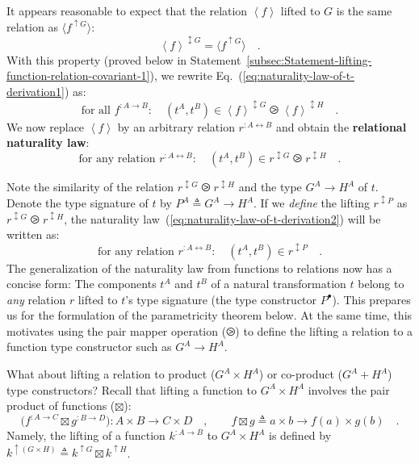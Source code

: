 It appears reasonable to expect that the relation $\left<f\right>$
lifted to $G$ is the same relation as $\langle f^{\uparrow G}\rangle$:
\[
\left<f\right>^{\updownarrow G}=\langle f^{\uparrow G}\rangle\quad.
\]
With this property (proved below in Statement~\ref{subsec:Statement-lifting-function-relation-covariant-1}),
we rewrite Eq.~(\ref{eq:naturality-law-of-t-derivation1}) as:
\[
\text{for all }f^{:A\rightarrow B}:\quad(t^{A},t^{B})\in\left<f\right>^{\updownarrow G}\ogreaterthan\left<f\right>^{\updownarrow H}\quad.
\]
We now replace $\left<f\right>$ by an arbitrary relation $r^{:A\leftrightarrow B}$
and obtain the \textbf{relational
naturality law}:
\begin{equation}
\text{for any relation }r^{:A\leftrightarrow B}:\quad(t^{A},t^{B})\in r^{\updownarrow G}\ogreaterthan r^{\updownarrow H}\quad.\label{eq:naturality-law-of-t-derivation2}
\end{equation}

Note the similarity of the relation $r^{\updownarrow G}\ogreaterthan r^{\updownarrow H}$
and the type $G^{A}\rightarrow H^{A}$ of $t$. Denote the type signature
of $t$ by $P^{A}\triangleq G^{A}\rightarrow H^{A}$. If we \emph{define}
the lifting $r^{\updownarrow P}$ as $r^{\updownarrow G}\ogreaterthan r^{\updownarrow H}$,
the naturality law~(\ref{eq:naturality-law-of-t-derivation2}) will
be written as:
\begin{equation}
\text{for any relation }r^{:A\leftrightarrow B}:\quad(t^{A},t^{B})\in r^{\updownarrow P}\quad.\label{eq:naturality-law-of-t-derivation3}
\end{equation}
The generalization of the naturality law from functions to relations
now has a concise form: The components $t^{A}$ and $t^{B}$ of a
natural transformation $t$ belong to \emph{any} relation $r$ lifted
to $t$\textsf{'}s type signature (the type constructor $P^{\bullet}$). This
prepares us for the formulation of the parametricity theorem below.
At the same time, this motivates using the pair mapper operation ($\ogreaterthan$)
to define the lifting a relation to a function type constructor such
as $G^{A}\rightarrow H^{A}$.

What about lifting a relation to product ($G^{A}\times H^{A}$) or
co-product ($G^{A}+H^{A}$) type constructors? Recall that lifting
a function to $G^{A}\times H^{A}$ involves the pair product of functions
($\boxtimes$):
\[
\big(f^{:A\rightarrow C}\boxtimes g^{:B\rightarrow D}\big):A\times B\rightarrow C\times D\quad,\quad\quad f\boxtimes g\triangleq a\times b\rightarrow f(a)\times g(b)\quad.
\]
Namely, the lifting of a function $k^{:A\rightarrow B}$ to $G^{A}\times H^{A}$
is defined by $k^{\uparrow(G\times H)}\triangleq k^{\uparrow G}\boxtimes k^{\uparrow H}$. 

